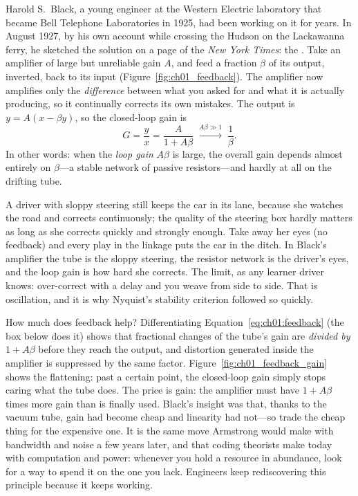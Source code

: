 Harold S.~Black, a young engineer at the Western Electric laboratory that became Bell Telephone
Laboratories in 1925, had been working on it for years. In August 1927, by his own account while
crossing the Hudson on the Lackawanna ferry, he sketched the solution on a page of the \emph{New York
Times}: the . Take an amplifier of large but unreliable gain $A$,
and feed a fraction $\beta$ of its output, inverted, back to its input
(Figure~\ref{fig:ch01_feedback}). The amplifier now amplifies only the \emph{difference} between what
you asked for and what it is actually producing, so it continually corrects its own mistakes. The
output is $y = A(x-\beta y)$, so the closed-loop gain is
\begin{equation}
G = \frac{y}{x} = \frac{A}{1+A\beta}\;\xrightarrow{A\beta\gg1}\;\frac{1}{\beta}.
\label{eq:ch01:feedback}
\end{equation}
In other words: when the \emph{loop gain} $A\beta$ is large, the overall gain depends almost entirely
on $\beta$---a stable network of passive resistors---and hardly at all on the drifting tube.



\begin{analogy}
A driver with sloppy steering still keeps the car in its lane, because she watches the road and
corrects continuously; the quality of the steering box hardly matters as long as she corrects
quickly and strongly enough. Take away her eyes (no feedback) and every play in the linkage puts the
car in the ditch. In Black's amplifier the tube is the sloppy steering, the resistor network is the
driver's eyes, and the loop gain is how hard she corrects. The limit, as any learner driver knows:
over-correct with a delay and you weave from side to side. That is oscillation, and it is why
Nyquist's stability criterion followed so quickly.
\end{analogy}

How much does feedback help? Differentiating Equation~\eqref{eq:ch01:feedback} (the box below does
it) shows that fractional changes of the tube's gain are \emph{divided by} $1+A\beta$ before they
reach the output, and distortion generated inside the amplifier is suppressed by the same factor.
Figure~\ref{fig:ch01_feedback_gain} shows the flattening: past a certain point, the closed-loop gain
simply stops caring what the tube does. The price is gain: the amplifier must have $1+A\beta$ times
more gain than is finally used. Black's insight was that, thanks to the vacuum tube, gain had become
cheap and linearity had not---so trade the cheap thing for the expensive one. It is the same move
Armstrong would make with bandwidth and noise a few years later, and that coding theorists make today
with computation and power: whenever you hold a resource in abundance, look for a way to spend it on
the one you lack. Engineers keep rediscovering this principle because it keeps working.

